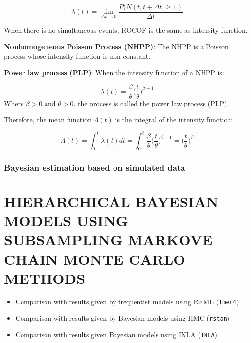 \documentclass[12pt]{book}
\numberwithin{equation}{chapter}
\providecommand{\tightlist}{%
  \setlength{\itemsep}{0pt}\setlength{\parskip}{0pt}}
\begin{document}
\[\lambda(t) = \lim_{\Delta t \rightarrow 0}\frac{P(N(t, t+\Delta t] \geq 1)}{\Delta t}\]

When there is no simultaneous events, ROCOF is the same as intensity function.

\textbf{Nonhomogeneous Poisson Process (NHPP)}: The NHPP is a Poisson process whose intensity function is non-constant.

\textbf{Power law process (PLP)}: When the intensity function of a NHPP is:

\[\lambda(t) = \frac{\beta}{\theta}\bigg(\frac{t}{\theta}\bigg)^{\beta-1}\]
Where \(\beta > 0\) and \(\theta > 0\), the process is called the power law process (PLP).

Therefore, the mean function \(\Lambda(t)\) is the integral of the intensity function:

\[\Lambda(t) = \int_0^t \lambda(t)dt = \int_0^t \frac{\beta}{\theta}\bigg(\frac{t}{\theta}\bigg)^{\beta-1} = \bigg(\frac{t}{\theta}\bigg)^{\beta}\]

\hypertarget{section}{%
\subsection{}\label{section}}

\hypertarget{bayesian-estimation-based-on-simulated-data-1}{%
\subsection{Bayesian estimation based on simulated data}\label{bayesian-estimation-based-on-simulated-data-1}}

\hypertarget{hierarchical-bayesian-models-using-subsampling-markove-chain-monte-carlo-methods}{%
\chapter{HIERARCHICAL BAYESIAN MODELS USING SUBSAMPLING MARKOVE CHAIN MONTE CARLO METHODS}\label{hierarchical-bayesian-models-using-subsampling-markove-chain-monte-carlo-methods}}

\begin{itemize}
\tightlist
\item
  Comparison with results given by frequentist models using REML (\texttt{lmer4})
\item
  Comparison with results given by Bayesian models using HMC (\texttt{rstan})
\item
  Comparison with results given Bayesian models using INLA (\texttt{INLA})
\end{itemize}
\end{document}

